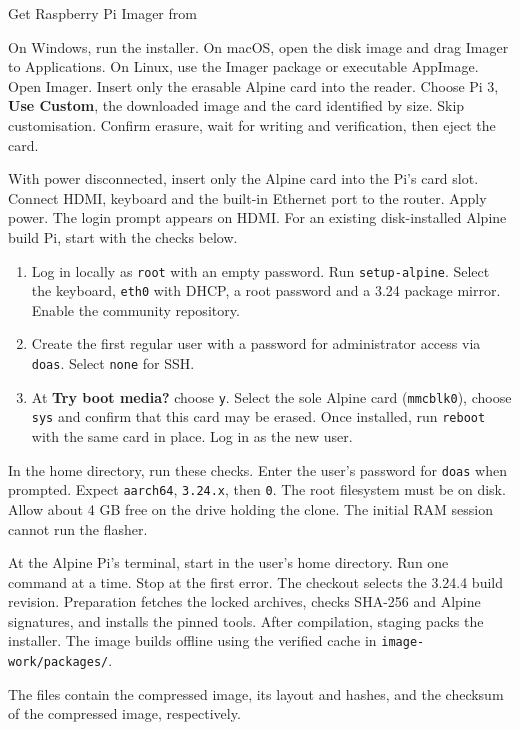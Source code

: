 Get Raspberry Pi Imager from \imagerSite

On Windows, run the installer. On macOS, open the disk image and drag Imager to Applications. On Linux, use the Imager package or executable AppImage. Open Imager. Insert only the erasable Alpine card into the reader. Choose Pi 3, \textbf{Use Custom}, the downloaded image and the card identified by size. Skip customisation. Confirm erasure, wait for writing and verification, then eject the card.

With power disconnected, insert only the Alpine card into the Pi's card slot. Connect HDMI, keyboard and the built-in Ethernet port to the router. Apply power. The login prompt appears on HDMI. For an existing disk-installed Alpine build Pi, start with the checks below.
\begin{enumerate}
\item Log in locally as \texttt{root} with an empty password. Run \texttt{setup-alpine}. Select the keyboard, \texttt{eth0} with DHCP, a root password and a 3.24 package mirror. Enable the community repository.
\item Create the first regular user with a password for administrator access via \texttt{doas}. Select \texttt{none} for SSH.
\item At \textbf{Try boot media?} choose \texttt{y}. Select the sole Alpine card (\texttt{mmcblk0}), choose \texttt{sys} and confirm that this card may be erased. Once installed, run \texttt{reboot} with the same card in place. Log in as the new user.
\end{enumerate}
In the home directory, run these checks. Enter the user's password for \texttt{doas} when prompted.
\envCommands
Expect \texttt{aarch64}, \texttt{3.24.x}, then \texttt{0}. The root filesystem must be on disk. Allow about 4 GB free on the drive holding the clone. The initial RAM session cannot run the flasher.

\sourceURL

At the Alpine Pi's terminal, start in the user's home directory. Run one command at a time. Stop at the first error.
\buildCommands
The checkout selects the 3.24.4 build revision. Preparation fetches the locked archives, checks SHA-256 and Alpine signatures, and installs the pinned tools. After compilation, staging packs the installer. The image builds offline using the verified cache in \texttt{image-work/packages/}.

The files contain the compressed image, its layout and hashes, and the checksum of the compressed image, respectively.
\outputFiles

